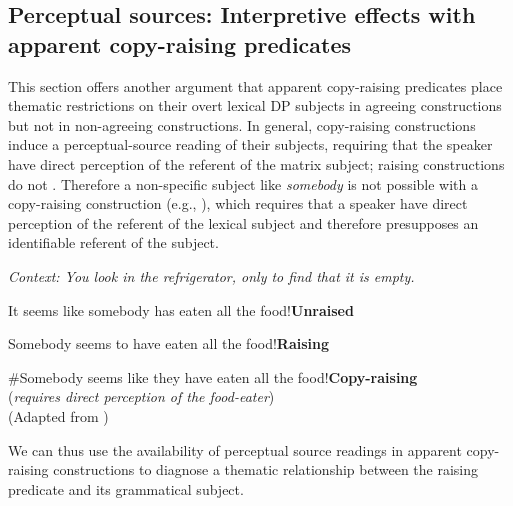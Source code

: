 \documentclass[output=paper,colorlinks,citecolor=brown
]{langscibook}
\begin{document}
\subsection{Perceptual sources: Interpretive effects with apparent copy-raising predicates}

This section offers another argument that apparent copy-raising predicates place thematic restrictions on their overt lexical DP subjects in agreeing constructions but not in non-agreeing constructions. In general, copy-raising constructions induce a perceptual-source reading of their subjects, requiring that the speaker have direct perception of the referent of the matrix subject; raising constructions do not \citep{CarstensDiercks:2013:Hyper-Raising,PotsdamRunner:2001:CopyRaising}. Therefore a non-specific subject like \textit{somebody} is not possible with a copy-raising construction (e.g., ), which requires that a speaker have direct perception of the referent of the lexical subject and therefore presupposes an identifiable referent of the subject. 

\ea \label{ex:johnson:ReconstructedReadingDiagnostic} \textit{Context: You look in the refrigerator, only to find that it is empty.}

\begin{xlist}

\ex It seems like somebody has eaten all the food!\hfill\textbf{Unraised}

\ex Somebody seems to have eaten all the food!\hfill\textbf{Raising}

\ex \label{ex:johnson:ReconstructedReadingDiagnosticSomeone}  \#Somebody seems like they have eaten all the food!\hfill\textbf{Copy-raising} \\ (\textit{requires direct perception of the food-eater}) \\  (Adapted from \citealt{CarstensDiercks:2013:Hyper-Raising}) 

\end{xlist}
\z 

\noindent We can thus use the availability of perceptual source readings in apparent copy-raising constructions to diagnose a thematic relationship between the raising predicate and its grammatical subject.
\end{document}

